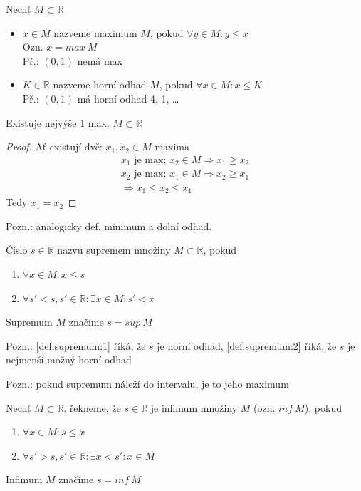 \begin{definition}[Maximum]
	Nechť $M\subset\mathbb{R}$
	\begin{itemize}
		\item $x\in M$ nazveme maximum $M$, pokud $\forall y\in M: y\leq x$ \\
			Ozn. $x=max~M$ \\
			Př.: $(0,1)$ nemá max
		\item $K\in\mathbb{R}$ nazveme horní odhad $M$, pokud $\forall x\in M: x\leq K$ \\
			Př.: $(0,1)$ má horní odhad 4, 1, \ldots
	\end{itemize}
\end{definition}

\begin{lemma}
	Existuje nejvýše 1 max. $M\subset\mathbb{R}$
\end{lemma}
\begin{proof}
	Ať existují dvě: $x_1, x_2\in M$ maxima
	\begin{gather}
		x_1 \text{ je max; }x_2\in M \Rightarrow x_1\geq x_2 \\
		x_2 \text{ je max; }x_1\in M \Rightarrow x_2\geq x_1 \\
		\Rightarrow x_1\leq x_2\leq x_1
	\end{gather}
	Tedy $x_1=x_2$
\end{proof}

Pozn.: analogicky def. minimum a dolní odhad.

\begin{definition}[name=Supremum, label=def:supremum]
	Číslo $s\in\mathbb{R}$ nazvu supremem množiny $M\subset\mathbb{R}$, pokud
	\begin{enumerate}[I]
		\item\label{def:supremum:1} $\forall x\in M: x\leq s$
		\item\label{def:supremum:2} $\forall s'<s, s'\in\mathbb{R}: \exists x\in M: s'<x$
	\end{enumerate}
	Supremum $M$ značíme $s=sup~M$
\end{definition}

Pozn.: \autoref{def:supremum:1} říká, že $s$ je horní odhad, \autoref{def:supremum:2} říká,
že $s$ je nejmenší možný horní odhad

Pozn.: pokud supremum náleží do intervalu, je to jeho maximum

\begin{definition}[Infimum]
	Nechť $M\subset\mathbb{R}$. řekneme, že $s\in\mathbb{R}$ je infimum množiny $M$
	(ozn. $inf~M$), pokud
	\begin{enumerate}[I]
		\item\label{def:infimum:1} $\forall x\in M: s\leq x$
		\item\label{def:infimum:2} $\forall s'>s, s'\in\mathbb{R}: \exists x<s': x\in M$
	\end{enumerate}
	Infimum $M$ značíme $s=inf~M$
\end{definition}

